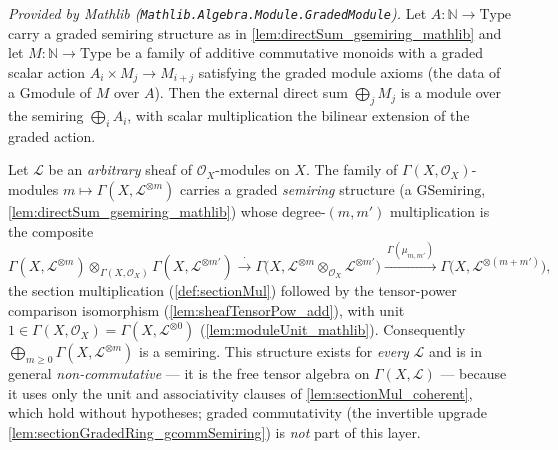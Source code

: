 \begin{lemma}
  \label{lem:directSum_gmodule_mathlib}
  \mathlibok
  \textit{Provided by Mathlib (\texttt{Mathlib.Algebra.Module.GradedModule}).}
  Let \(A : \mathbb{N} \to \mathrm{Type}\) carry a graded semiring structure as
  in \cref{lem:directSum_gsemiring_mathlib} and let
  \(M : \mathbb{N} \to \mathrm{Type}\) be a family of additive commutative
  monoids with a graded scalar action \(A_i \times M_j \to M_{i+j}\) satisfying
  the graded module axioms (the data of a \(\mathrm{Gmodule}\) of \(M\) over
  \(A\)). Then the external direct sum \(\bigoplus_j M_j\) is a module over the
  semiring \(\bigoplus_i A_i\), with scalar multiplication the bilinear
  extension of the graded action.
\end{lemma}

\begin{lemma}
  \label{lem:sectionGradedRing_gsemiring}
  Let \(\mathcal{L}\) be an \emph{arbitrary} sheaf of \(\mathcal{O}_X\)-modules on
  \(X\). The family of \(\Gamma(X,\mathcal{O}_X)\)-modules
  \(m \mapsto \Gamma(X, \mathcal{L}^{\otimes m})\) carries a graded
  \emph{semiring} structure (a \(\mathrm{GSemiring}\),
  \cref{lem:directSum_gsemiring_mathlib}) whose degree-\((m,m')\) multiplication is
  the composite
  \[
    \Gamma(X, \mathcal{L}^{\otimes m}) \otimes_{\Gamma(X,\mathcal{O}_X)}
      \Gamma(X, \mathcal{L}^{\otimes m'})
    \xrightarrow{\ \cdot\ }
    \Gamma\bigl(X, \mathcal{L}^{\otimes m} \otimes_{\mathcal{O}_X}
      \mathcal{L}^{\otimes m'}\bigr)
    \xrightarrow{\ \Gamma(\mu_{m,m'})\ }
    \Gamma\bigl(X, \mathcal{L}^{\otimes (m+m')}\bigr),
  \]
  the section multiplication (\cref{def:sectionMul}) followed by the tensor-power
  comparison isomorphism (\cref{lem:sheafTensorPow_add}), with unit
  \(1 \in \Gamma(X, \mathcal{O}_X) = \Gamma(X, \mathcal{L}^{\otimes 0})\)
  (\cref{lem:moduleUnit_mathlib}). Consequently
  \(\bigoplus_{m \ge 0} \Gamma(X, \mathcal{L}^{\otimes m})\) is a semiring. This
  structure exists for \emph{every} \(\mathcal{L}\) and is in general
  \emph{non-commutative} --- it is the free tensor algebra on
  \(\Gamma(X,\mathcal{L})\) --- because it uses only the unit and associativity
  clauses of \cref{lem:sectionMul_coherent}, which hold without hypotheses; graded
  commutativity (the invertible upgrade \cref{lem:sectionGradedRing_gcommSemiring})
  is \emph{not} part of this layer.
\end{lemma}

